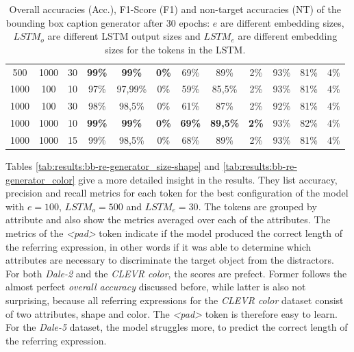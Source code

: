 \begin{table}[ht]
\begin{tabular}{ccc|ccc|ccc|ccc}
        {500}  & {1000}   & {30}     & \textbf{99\%}                       & \textbf{99\%}                       & \textbf{0\%}                             & {69\%}        & {89\%}          & {2\%}        & {93\%}        & {81\%}        & {4\%}        \\
        {1000} & {100}    & {10}     & {97\%}                              & {97,99\%}                           & {0\%}                                    & {59\%}        & {85,5\%}        & {2\%}        & {93\%}        & {81\%}        & {4\%}        \\
        {1000} & {100}    & {30}     & {98\%}                              & {98,5\%}                            & {0\%}                                    & {61\%}        & {87\%}          & {2\%}        & {92\%}        & {81\%}        & {4\%}        \\
        {1000} & {1000}   & {10}     & \textbf{99\%}                       & \textbf{99\%}                       & \textbf{0\%}                             & \textbf{69\%} & \textbf{89,5\%} & \textbf{2\%} & {93\%}        & {82\%}        & {4\%}        \\
        {1000} & {1000}   & {15}     & {99\%}                              & {98,5\%}                            & {0\%}                                    & {68\%}        & {89\%}          & {2\%}        & {93\%}        & {81\%}        & {4\%}        \\
        \bottomrule
    \end{tabular}
    \caption{Overall accuracies (Acc.), F1-Score (F1) and non-target accuracies (NT) of the bounding box caption generator after 30 epochs: $e$ are different embedding sizes, $LSTM_o$ are different LSTM output sizes and $LSTM_e$ are different embedding sizes for the tokens in the LSTM.}
    \label{tab:results:bb-re-generator}
\end{table}

Tables \ref{tab:results:bb-re-generator_size-shape} and \ref{tab:results:bb-re-generator_color} give a more detailed insight in the results.
They list accuracy, precision and recall metrics for each token for the best configuration of the model with $e=100$, $LSTM_o=500$ and $LSTM_e=30$.
The tokens are grouped by attribute and also show the metrics averaged over each of the attributes.
The metrics of the \emph{<pad>} token indicate if the model produced the correct length of the referring expression, in other words if it was able to determine which attributes are necessary to discriminate the target object from the distractors.
For both \emph{Dale-2} and the \emph{CLEVR color}, the scores are prefect.
Former follows the almost perfect \emph{overall accuracy} discussed before, while latter is also not surprising, because all referring expressions for the \emph{CLEVR color} dataset consist of two attributes, shape and color.
The \emph{<pad>} token is therefore easy to learn.
For the \emph{Dale-5} dataset, the model struggles more, to predict the correct length of the referring expression.


